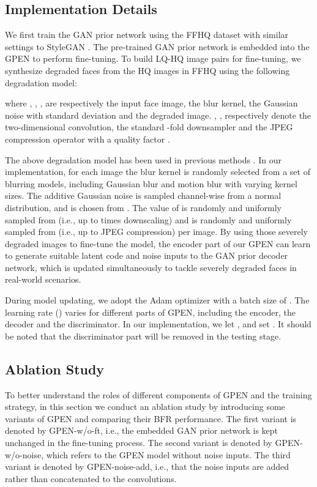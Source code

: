 \documentclass[final]{cvpr}
\begin{document}
\subsection{Implementation Details}
\label{sec:degradation}
We first train the GAN prior network using the FFHQ dataset with similar settings to StyleGAN \cite{Karras2018StyleGAN,Karras2019StyleGAN2}. The pre-trained GAN prior network is embedded into the GPEN to perform fine-tuning. To build LQ-HQ image pairs for fine-tuning, we synthesize degraded faces from the HQ images in FFHQ using the following degradation model:

where , , ,  are respectively the input face image, the blur kernel, the Gaussian noise with standard deviation  and the degraded image. , ,  respectively denote the two-dimensional convolution, the standard -fold downsampler and the JPEG compression operator with a quality factor . 

The above degradation model has been used in previous methods \cite{Li2018GFRNet,Li2020Restore}. In our implementation, for each image the blur kernel  is randomly selected from a set of blurring models, including Gaussian blur and motion blur with varying kernel sizes. The additive Gaussian noise  is sampled channel-wise from a normal distribution, and  is chosen from . The value of  is randomly and uniformly sampled from  (i.e., up to  times downscaling) and  is randomly and uniformly sampled from  (i.e., up to  JPEG compression) per image. By using those severely degraded images to fine-tune the model, the encoder part of our GPEN can learn to generate suitable latent code and noise inputs to the GAN prior decoder network, which is updated simultaneously to tackle severely degraded faces in real-world scenarios. 

During model updating, we adopt the Adam optimizer with a batch size of . The learning rate () varies for different parts of GPEN, including the encoder, the decoder and the discriminator. In our implementation, we let , and set . It should be noted that the discriminator part will be removed in the testing stage. 







\subsection{Ablation Study}
To better understand the roles of different components of GPEN and the training strategy, in this section we conduct an ablation study by introducing some variants of GPEN and comparing their BFR performance. The first variant is denoted by GPEN-w/o-ft, i.e., the embedded GAN prior network is kept unchanged in the fine-tuning process. The second variant is denoted by GPEN-w/o-noise, which refers to the GPEN model without noise inputs. The third variant is denoted by GPEN-noise-add, i.e., that the noise inputs are added rather than concatenated to the convolutions.
\end{document}
